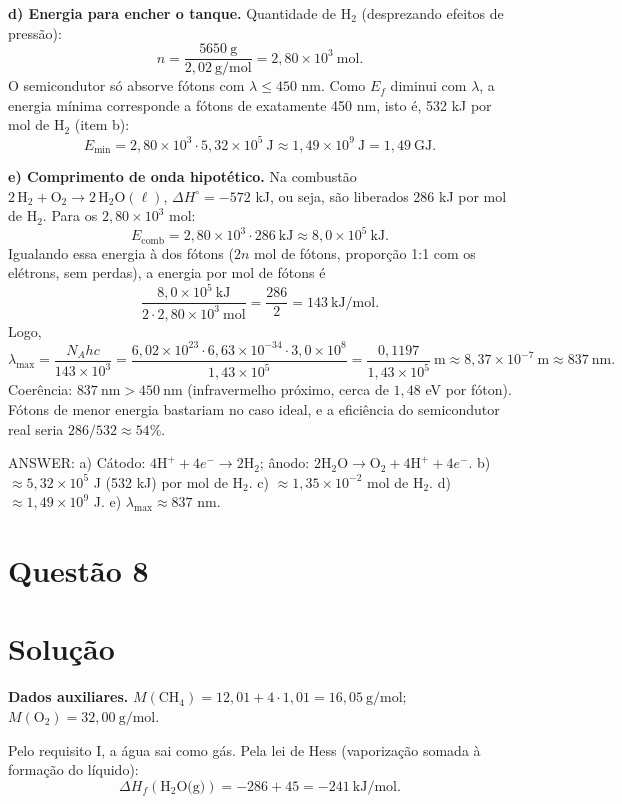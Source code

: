 \documentclass{article}%
\begin{document}
\medskip
\textbf{d) Energia para encher o tanque.} Quantidade de H$_2$ (desprezando efeitos de pressão):
\[
n=\frac{5650\ \text{g}}{2{,}02\ \text{g/mol}}=2{,}80\times10^{3}\ \text{mol}.
\]
O semicondutor só absorve fótons com $\lambda\le 450$ nm. Como $E_f$ diminui com $\lambda$, a energia mínima corresponde a fótons de exatamente 450 nm, isto é, 532 kJ por mol de H$_2$ (item b):
\[
E_{\min}=2{,}80\times10^{3}\cdot 5{,}32\times10^{5}\ \text{J}\approx 1{,}49\times10^{9}\ \text{J}=1{,}49\ \text{GJ}.
\]

\medskip
\textbf{e) Comprimento de onda hipotético.} Na combustão $2\,\text{H}_2 + \text{O}_2 \rightarrow 2\,\text{H}_2\text{O}(\ell)$, $\Delta H^\circ=-572$ kJ, ou seja, são liberados 286 kJ por mol de H$_2$. Para os $2{,}80\times10^{3}$ mol:
\[
E_{\text{comb}}=2{,}80\times10^{3}\cdot 286\ \text{kJ}\approx 8{,}0\times10^{5}\ \text{kJ}.
\]
Igualando essa energia à dos fótons ($2n$ mol de fótons, proporção 1:1 com os elétrons, sem perdas), a energia por mol de fótons é
\[
\frac{8{,}0\times10^{5}\ \text{kJ}}{2\cdot 2{,}80\times10^{3}\ \text{mol}}=\frac{286}{2}=143\ \text{kJ/mol}.
\]
Logo,
\[
\lambda_{\max}=\frac{N_A hc}{143\times10^{3}}=\frac{6{,}02\times10^{23}\cdot 6{,}63\times10^{-34}\cdot 3{,}0\times10^{8}}{1{,}43\times10^{5}}=\frac{0{,}1197}{1{,}43\times10^{5}}\ \text{m}\approx 8{,}37\times10^{-7}\ \text{m}\approx 837\ \text{nm}.
\]
Coerência: $837\ \text{nm}>450\ \text{nm}$ (infravermelho próximo, cerca de $1{,}48$ eV por fóton). Fótons de menor energia bastariam no caso ideal, e a eficiência do semicondutor real seria $286/532\approx 54\%$.

\medskip
ANSWER: a) Cátodo: $4\text{H}^+ + 4e^- \rightarrow 2\text{H}_2$; ânodo: $2\text{H}_2\text{O} \rightarrow \text{O}_2 + 4\text{H}^+ + 4e^-$. b) $\approx 5{,}32\times10^{5}$ J (532 kJ) por mol de H$_2$. c) $\approx 1{,}35\times10^{-2}$ mol de H$_2$. d) $\approx 1{,}49\times10^{9}$ J. e) $\lambda_{\max}\approx 837$ nm.%
\newpage%
\section*{Questão 8}

\section*{Solução}

\textbf{Dados auxiliares.} $M(\text{CH}_4)=12{,}01+4\cdot 1{,}01=16{,}05\ \text{g/mol}$; $M(\text{O}_2)=32{,}00\ \text{g/mol}$.

Pelo requisito I, a água sai como gás. Pela lei de Hess (vaporização somada à formação do líquido):
\[
\Delta H_f(\text{H}_2\text{O(g)})=-286+45=-241\ \text{kJ/mol}.
\]
\end{document}
